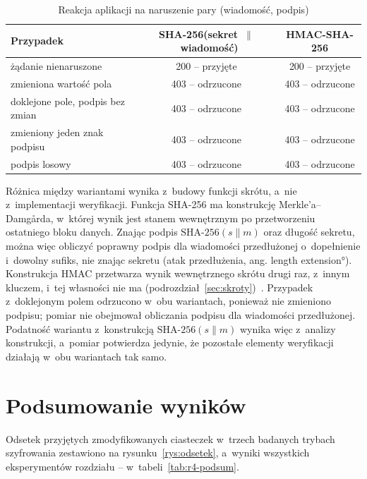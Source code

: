 \begin{table}[htbp]
\centering\small
\begin{tabular}{@{}lcc@{}}
\toprule
\textbf{Przypadek} & \textbf{SHA-256(sekret~$\|$~wiadomość)} & \textbf{HMAC-SHA-256} \\
\midrule
żądanie nienaruszone                    & 200 -- przyjęte   & 200 -- przyjęte \\
zmieniona wartość pola                  & 403 -- odrzucone  & 403 -- odrzucone \\
doklejone pole, podpis bez zmian        & 403 -- odrzucone  & 403 -- odrzucone \\
zmieniony jeden znak podpisu            & 403 -- odrzucone  & 403 -- odrzucone \\
podpis losowy                           & 403 -- odrzucone  & 403 -- odrzucone \\
\bottomrule
\end{tabular}
\caption{Reakcja aplikacji na naruszenie pary (wiadomość, podpis)}
\label{tab:podpis}
\end{table}

Różnica między wariantami wynika z~budowy funkcji skrótu, a~nie z~implementacji weryfikacji. Funkcja SHA-256 ma konstrukcję Merkle'a--Damgårda, w~której wynik jest stanem wewnętrznym po przetworzeniu ostatniego bloku danych. Znając podpis $\mathrm{SHA\text{-}256}(s \| m)$ oraz długość sekretu, można więc obliczyć poprawny podpis dla wiadomości przedłużonej o~dopełnienie i~dowolny sufiks, nie znając sekretu (atak przedłużenia, ang. \ang{length extension}). Konstrukcja HMAC przetwarza wynik wewnętrznego skrótu drugi raz, z~innym kluczem, i~tej własności nie ma (podrozdział~\ref{sec:skroty})~\cite{boneh2023}. Przypadek z~doklejonym polem odrzucono w~obu wariantach, ponieważ nie zmieniono podpisu; pomiar nie obejmował obliczania podpisu dla wiadomości przedłużonej. Podatność wariantu z~konstrukcją $\mathrm{SHA\text{-}256}(s \| m)$ wynika więc z~analizy konstrukcji, a~pomiar potwierdza jedynie, że pozostałe elementy weryfikacji działają w~obu wariantach tak samo.

\section{Podsumowanie wyników}\label{sec:ataki-podsum}

Odsetek przyjętych zmodyfikowanych ciasteczek w~trzech badanych trybach szyfrowania zestawiono na rysunku~\ref{rys:odsetek}, a~wyniki wszystkich eksperymentów rozdziału -- w~tabeli~\ref{tab:r4-podsum}.

